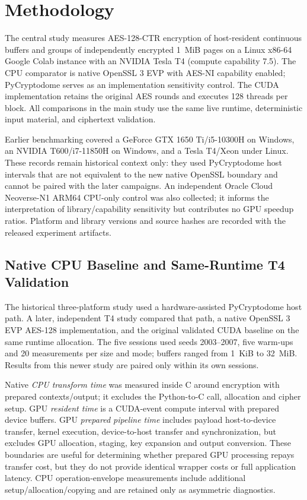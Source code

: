 \section{Methodology}
\label{sec:methodology}

The central study measures AES-128-CTR encryption of host-resident
continuous buffers and groups of independently encrypted 1~MiB pages on a
Linux x86-64 Google Colab instance with an NVIDIA Tesla T4 (compute
capability 7.5). The CPU comparator is native OpenSSL 3 EVP with AES-NI
capability enabled; PyCryptodome serves as an implementation sensitivity
control. The CUDA implementation retains the original AES rounds and
executes 128 threads per block. All comparisons in the main study use the
same live runtime, deterministic input material, and ciphertext validation.

Earlier benchmarking covered a GeForce GTX 1650 Ti/i5-10300H on Windows,
an NVIDIA T600/i7-11850H on Windows, and a Tesla T4/Xeon under Linux.
These records remain historical context only: they used PyCryptodome host
intervals that are not equivalent to the new native OpenSSL boundary and
cannot be paired with the later campaigns. An independent Oracle Cloud
Neoverse-N1 ARM64 CPU-only control was also collected; it informs the
interpretation of library/capability sensitivity but contributes no GPU
speedup ratios. Platform and library versions and source hashes are
recorded with the released experiment artifacts.

\subsection{Native CPU Baseline and Same-Runtime T4 Validation}
\label{sec:evp-method}
The historical three-platform study used a hardware-assisted PyCryptodome host
path. A later, independent T4 study compared that path, a native OpenSSL 3 EVP
AES-128 implementation, and the original validated CUDA baseline on the same
runtime allocation. The five sessions used seeds 2003--2007, five warm-ups and
20 measurements per size and mode; buffers ranged from 1~KiB to 32~MiB.
Results from this newer study are paired only within its own sessions.

Native \emph{CPU transform time} was measured inside C around encryption with
prepared contexts/output; it excludes the Python-to-C call, allocation and
cipher setup. GPU \emph{resident time} is a CUDA-event compute interval with
prepared device buffers. GPU \emph{prepared pipeline time} includes payload
host-to-device transfer, kernel execution, device-to-host transfer and
synchronization, but excludes GPU allocation, staging, key expansion and output
conversion. These boundaries are useful for determining whether prepared GPU
processing repays transfer cost, but they do not provide identical wrapper
costs or full application latency. CPU operation-envelope measurements include
additional setup/allocation/copying and are retained only as asymmetric
diagnostics.

